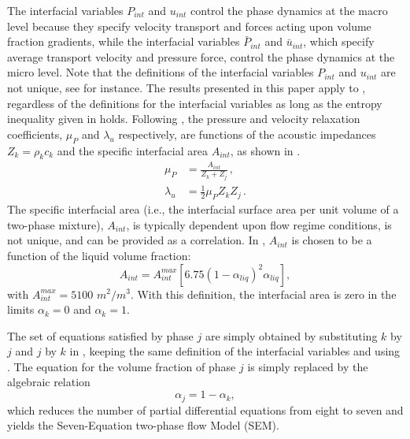 %
The interfacial variables $P_{int}$ and $u_{int}$ control the phase dynamics at the macro level because they specify velocity transport
and forces acting upon volume fraction gradients, while the interfacial variables $\bar{P}_{int}$ and $\bar{u}_{int}$, which specify 
average transport velocity and pressure force, control the phase dynamics at the micro level.  Note that the definitions of the interfacial 
variables $P_{int}$ and 
$u_{int}$ are not unique, see \cite{Saleh_phd_thesis} for instance. The results presented in this paper apply to ,
regardless of the definitions for the interfacial variables as long as the entropy inequality given in  holds. 
Following \cite{SEM}, the pressure and velocity relaxation coefficients, $\mu_P$  and $\lambda_u$ respectively, are functions of the acoustic 
impedances $Z_k = \rho_k c_k$ and the specific interfacial area $A_{int}$, as shown in .
%
\begin{subequations}
\label{eq:relaxation_coeff}
\begin{align}
  \label{E-R:86}
  \mu_P &= \frac{A_{int}}{Z_{k}+Z_{j}}       \,,
  \\
  \label{E-R:85}
  \lambda_u &= \frac{1}{2} \mu_P Z_{k} Z_{j} \,.
\end{align}
\end{subequations}
%
The specific interfacial area (i.e., the interfacial surface area per unit volume of a two-phase mixture), $A_{int}$, is typically 
dependent upon flow regime conditions, is not unique, and can be provided as a correlation.
In \cite{SEM}, $A_{int}$ is chosen to be a function of the liquid volume fraction:
%
\begin{equation}\label{eq:Aint-sect4}
A_{int} = A_{int}^{max} \left[ 6.75 \left(1-\alpha_{liq} \right)^2 \alpha_{liq} \right],
\end{equation}
% 
with $A_{int}^{max} = 5100$ $m^2 / m^3$. With this definition, the interfacial area is zero in the limits $\alpha_{k} = 0$ and $\alpha_{k} = 1$.

The set of equations satisfied by phase $j$ are simply obtained by substituting $k$ by $j$ and $j$ by $k$ in , keeping 
the same definition of the interfacial variables and using . The equation for the volume fraction of phase $j$ is simply 
replaced by the algebraic relation
%
\begin{equation}
 \alpha_{j}= 1 - \alpha_{k}, 
\end{equation}
%
which reduces the number of partial differential equations from eight to seven and yields the Seven-Equation two-phase flow Model (SEM). 
%
